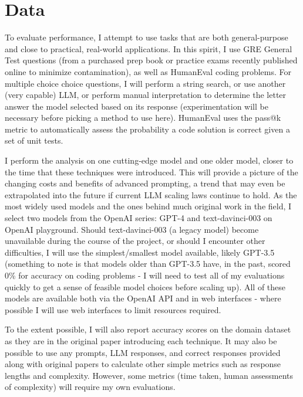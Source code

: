\documentclass[11pt]{article}
\begin{document}
\section*{Data}

To evaluate performance, I attempt to use tasks that are both general-purpose and close to practical, real-world applications. In this spirit, I use GRE General Test questions (from a purchased prep book or practice exams recently published online to minimize contamination), as well as HumanEval coding problems. For multiple choice choice questions, I will perform a string search, or use another (very capable) LLM, or perform manual interpretation to determine the letter answer the model selected based on its response (experimentation will be necessary before picking a method to use here). HumanEval uses the pass@k metric to automatically assess the probability a code solution is correct given a set of unit tests. \cite{chen_evaluating_2021}

I perform the analysis on one cutting-edge model and one older model, closer to the time that these techniques were introduced. This will provide a picture of the changing costs and benefits of advanced prompting, a trend that may even be extrapolated into the future if current LLM scaling laws continue to hold. As the most widely used models and the ones behind much original work in the field, I select two models from the OpenAI series: GPT-4 and text-davinci-003 on OpenAI playground. Should text-davinci-003 (a legacy model) become unavailable during the course of the project, or should I encounter other difficulties, I will use the simplest/smallest model available, likely GPT-3.5 (something to note is that models older than GPT-3.5 have, in the past, scored 0\% for accuracy on coding problems - I will need to test all of my evaluations quickly to get a sense of feasible model choices before scaling up). All of these models are available both via the OpenAI API and in web interfaces - where possible I will use web interfaces to limit resources required.

To the extent possible, I will also report accuracy scores on the domain dataset as they are in the original paper introducing each technique. It may also be possible to use any prompts, LLM responses, and correct responses provided along with original papers to calculate other simple metrics such as response lengths and complexity. However, some metrics (time taken, human assessments of complexity) will require my own evaluations.
\end{document}
